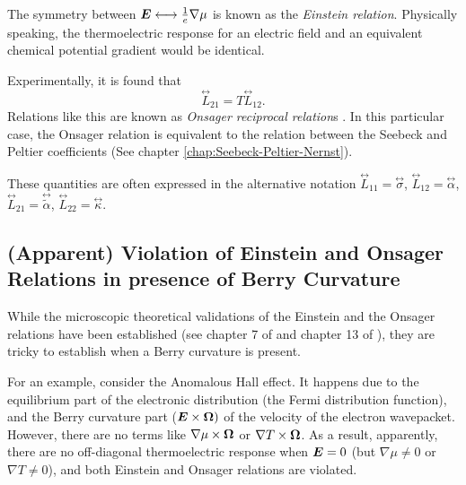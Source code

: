 \documentclass{report}
\renewcommand\vec[1]{\ensuremath\boldsymbol{#1}} %
\begin{document}
The symmetry between $\vec{E} \longleftrightarrow \frac{1}{e}\nabla \mu$ is known as the \textit{Einstein relation}. Physically speaking, the thermoelectric response for an electric field and an equivalent chemical potential gradient would be identical.
 
Experimentally, it is found that
\begin{equation}\label{Eq:Onsager-relation}
	\stackrel{\leftrightarrow}{L}_{21} = T \stackrel{\leftrightarrow}{L}_{12}.
\end{equation}
Relations like this are known as \textit{Onsager reciprocal relation}s \cite{OnsagerPhysRev.37.405}. In this particular case, the Onsager relation is equivalent to the relation between the Seebeck and Peltier coefficients (See chapter \ref{chap:Seebeck-Peltier-Nernst}).

These quantities are often expressed \cite{Ussishkin_2002} in the alternative notation $\stackrel{\leftrightarrow}{L}_{1 1} = \stackrel{\leftrightarrow}{\sigma}$, $\stackrel{\leftrightarrow}{L}_{1 2} = \stackrel{\leftrightarrow}{\alpha}$, $\stackrel{\leftrightarrow}{L}_{2 1} = \stackrel{\leftrightarrow}{\tilde{\alpha}}$, $\stackrel{\leftrightarrow}{L}_{2 2} = \stackrel{\leftrightarrow}{\kappa}$.

\subsection{(Apparent) Violation of Einstein and Onsager Relations in presence of Berry Curvature}\label{sec:Einstein-Onsager-violation}
While the microscopic theoretical validations of the Einstein and the Onsager relations have been established (see chapter 7 of \cite{book:ZimanSolidState} and chapter 13 of \cite{book:AshcroftMermin76}), they are tricky to establish when a Berry curvature is present.

For an example, consider the Anomalous Hall effect. It happens due to the equilibrium part of the electronic distribution (the Fermi distribution function), and the Berry curvature part ($\vec{E} \times \vec{\Omega})$ of the velocity of the electron wavepacket. However, there are no terms like $\nabla \mu \times \vec{\Omega}$ or $\nabla T \times \vec{\Omega}$. As a result, apparently, there are no off-diagonal thermoelectric response when $\vec{E} = 0$ (but $\nabla \mu \neq 0$ or $\nabla T \neq 0$), and both Einstein and Onsager relations are violated.
\end{document}
